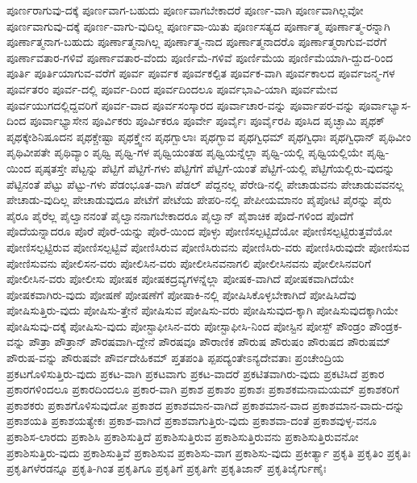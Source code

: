 {ಪೂರ್ಣರಾಗುವು-ದಕ್ಕೆ
ಪೂರ್ಣವಾಗ-ಬಹುದು
ಪೂರ್ಣವಾಗಬೇಕಾದರೆ
ಪೂರ್ಣ-ವಾಗಿ
ಪೂರ್ಣವಾಗಿಲ್ಲವೋ
ಪೂರ್ಣವಾಗುವು-ದಕ್ಕೆ
ಪೂರ್ಣ-ವಾಗು-ವುದಿಲ್ಲ
ಪೂರ್ಣವಾ-ಯಿತು
ಪೂರ್ಣಸತ್ಯದ
ಪೂರ್ಣಾತ್ಮ
ಪೂರ್ಣಾತ್ಮ-ರನ್ನಾಗಿ
ಪೂರ್ಣಾತ್ಮನಾಗ-ಬಹುದು
ಪೂರ್ಣಾತ್ಮನಾಗಿಲ್ಲ
ಪೂರ್ಣಾತ್ಮ-ನಾದ
ಪೂರ್ಣಾತ್ಮನಾದರೊ
ಪೂರ್ಣಾತ್ಮರಾಗುವ-ವರೆಗೆ
ಪೂರ್ಣಾವತಾರ-ಗಳಿವೆ
ಪೂರ್ಣಾವತಾರ-ವೆಂದು
ಪೂರ್ಣಿಮೆ-ಗಳಿವೆ
ಪೂರ್ಣಿಮೆಯ
ಪೂರ್ಣಿಮೆಯಾಗಿ-ದ್ದುದ-ರಿಂದ
ಪೂರ್ತಿ
ಪೂರ್ತಿಯಾಗುವ-ವರೆಗೆ
ಪೂರ್ವ
ಪೂರ್ವಕ
ಪೂರ್ವಕಲ್ಪಿತ
ಪೂರ್ವಕ-ವಾಗಿ
ಪೂರ್ವಕಾಲದ
ಪೂರ್ವಜನ್ಮ-ಗಳ
ಪೂರ್ವತರಂ
ಪೂರ್ವ-ದಲ್ಲಿ
ಪೂರ್ವ-ದಿಂದ
ಪೂರ್ವದಿಂದಲೂ
ಪೂರ್ವಭಾವಿ-ಯಾಗಿ
ಪೂರ್ವಮೇವ
ಪೂರ್ವಯುಗದಲ್ಲಿದ್ದವರಿಗೆ
ಪೂರ್ವ-ವಾದ
ಪೂರ್ವಸಂಸ್ಕಾರದ
ಪೂರ್ವಾಚಾರ-ವನ್ನು
ಪೂರ್ವಾಪರ-ವನ್ನು
ಪೂರ್ವಾಭ್ಯಾಸ-ದಿಂದ
ಪೂರ್ವಾಭ್ಯಾಸೇನ
ಪೂರ್ವಿಕರು
ಪೂರ್ವಿಕರೂ
ಪೂರ್ವೇ
ಪೂರ್ವೈಃ
ಪೂರ್ವೈರಪಿ
ಪೂಸಿದ
ಪೃಚ್ಛಾಮಿ
ಪೃಥಕ್
ಪೃಥಕ್ಕೇಶಿನಿಷೂದನ
ಪೃಥಕ್ಚೇಷ್ಟಾ
ಪೃಥಕ್ತ್ವೇನ
ಪೃಥಗ್ಬಾಲಾಃ
ಪೃಥಗ್ಭಾವ
ಪೃಥಗ್ವಿಧಮ್
ಪೃಥಗ್ವಿಧಾಃ
ಪೃಥಗ್ವಿಧಾನ್
ಪೃಥಿವೀಂ
ಪೃಥಿವೀಪತೇ
ಪೃಥಿವ್ಯಾಂ
ಪೃಥ್ವಿ
ಪೃಥ್ವಿ-ಗಳ
ಪೃಥ್ವಿಯಂತಹ
ಪೃಥ್ವಿಯನ್ನೆಲ್ಲಾ
ಪೃಥ್ವಿ-ಯಲ್ಲಿ
ಪೃಥ್ವಿಯಲ್ಲಿಯೇ
ಪೃಥ್ವಿ-ಯಿಂದ
ಪೃಷ್ಠತಸ್ತೇ
ಪೆಟ್ಟನ್ನು
ಪೆಟ್ಟಿಗೆ
ಪೆಟ್ಟಿಗೆ-ಗಳು
ಪೆಟ್ಟಿಗೆಗೆ
ಪೆಟ್ಟಿಗೆ-ಯಂತೆ
ಪೆಟ್ಟಿಗೆ-ಯಲ್ಲಿ
ಪೆಟ್ಟಿಗೆಯಲ್ಲಿರು-ವುದನ್ನು
ಪೆಟ್ಟಿನಂತೆ
ಪೆಟ್ಟು
ಪೆಟ್ಟು-ಗಳು
ಪೆಡಂಭೂತ-ವಾಗಿ
ಪೆಡಲ್
ಪೆದ್ದನಲ್ಲ
ಪೆರೇಡಿ-ನಲ್ಲಿ
ಪೇಚಾಡುವನು
ಪೇಚಾಡುವವನಲ್ಲ
ಪೇಚಾಡು-ವುದಿಲ್ಲ
ಪೇಚಾಡುವುದೂ
ಪೇಟೆಗೆ
ಪೇಟೆಯ
ಪೇಪರಿ-ನಲ್ಲಿ
ಪೇಪೀಯಮಾನಂ
ಪೈಪೋಟಿ
ಪೈರನ್ನು
ಪೈರು
ಪೈರೂ
ಪೈರೆಲ್ಲ
ಪೈಲ್ವಾನನಂತೆ
ಪೈಲ್ವಾನನಾಗಬೇಕಾದರೂ
ಪೈಲ್ವಾನ್
ಪೈಶಾಚಿಕ
ಪೊದೆ-ಗಳಿಂದ
ಪೊದೆಗೆ
ಪೊದೆಯನ್ನಾದರೂ
ಪೊರೆ
ಪೊರೆ-ಯನ್ನು
ಪೊರೆ-ಯಿಂದ
ಪೊಳ್ಳು
ಪೋಣಿಸಲ್ಪಟ್ಟಿದೆಯೋ
ಪೋಣಿಸಲ್ಪಟ್ಟಿರುತ್ತವೆಯೋ
ಪೋಣಿಸಲ್ಪಟ್ಟಿರುವ
ಪೋಣಿಸಲ್ಪಟ್ಟಿವೆ
ಪೋಣಿಸಿರುವ
ಪೋಣಿಸಿರುವನು
ಪೋಣಿಸಿರು-ವರು
ಪೋಣಿಸಿರುವುದೇ
ಪೋಣಿಸುವ
ಪೋಣಿಸುವನು
ಪೋಲಿಸನ-ವರು
ಪೋಲಿಸಿನ-ವರು
ಪೋಲೀಸಿನವನಾಗಲಿ
ಪೋಲೀಸಿನವನು
ಪೋಲೀಸಿನವರಿಗೆ
ಪೋಲೀಸಿನ-ವರು
ಪೋಲೀಸು
ಪೋಷಕ
ಪೋಷಕದ್ರವ್ಯಗಳನ್ನೆಲ್ಲಾ
ಪೋಷಕ-ವಾಗಿದೆ
ಪೋಷಕವಾಗಿದೆಯೇ
ಪೋಷಕವಾಗಿರು-ವುದು
ಪೋಷಣೆ
ಪೋಷಣೆಗೆ
ಪೋಷಾಕಿ-ನಲ್ಲಿ
ಪೋಷಿಸಿಕೊಳ್ಳಬೇಕಾಗಿದೆ
ಪೋಷಿಸಿದೆವು
ಪೋಷಿಸುತ್ತಿರು-ವುದು
ಪೋಷಿಸು-ತ್ತೇನೆ
ಪೋಷಿಸುವ
ಪೋಷಿಸು-ವರು
ಪೋಷಿಸುವುದ-ಕ್ಕಾಗಿ
ಪೋಷಿಸುವುದಕ್ಕಾಗಿಯೇ
ಪೋಷಿಸುವು-ದಕ್ಕೆ
ಪೋಷಿಸು-ವುದು
ಪೋಸ್ಟಾಫೀಸಿನ-ವರು
ಪೋಸ್ಟಾಫೀಸಿ-ನಿಂದ
ಪೋಸ್ಟಿನ
ಪೋಸ್ಟ್
ಪೌಂಡ್ರಂ
ಪೌಂಡ್ರಕ-ವನ್ನು
ಪೌತ್ರಾ
ಪೌತ್ರಾನ್
ಪೌರಷವಾಗಿ-ದ್ದೇನೆ
ಪೌರಷವೂ
ಪೌರಾಣಿಕ
ಪೌರುಷ
ಪೌರುಷಂ
ಪೌರುಷದ
ಪೌರುಷಮ್
ಪೌರುಷ-ವನ್ನು
ಪೌರುಷವೇ
ಪೌರ್ವದೇಹಿಕಮ್
ಪ್ತತಪಂತಿ
ಪ್ಪಪದ್ಯಂತೇಽನ್ಯದೇವತಾಃ
ಪ್ರಂಚೇಂದ್ರಿಯ
ಪ್ರಕಟಗೊಳಿಸುತ್ತಿರು-ವುದು
ಪ್ರಕಟ-ವಾಗಿ
ಪ್ರಕಟವಾಗು
ಪ್ರಕಟ-ವಾದರೆ
ಪ್ರಕಟಿತವಾಗಿರು-ವುದು
ಪ್ರಕಟಿಸಿದೆ
ಪ್ರಕಾರ
ಪ್ರಕಾರಗಳಿಂದಲೂ
ಪ್ರಕಾರದಿಂದಲೂ
ಪ್ರಕಾರ-ವಾಗಿ
ಪ್ರಕಾಶ
ಪ್ರಕಾಶಂ
ಪ್ರಕಾಶಃ
ಪ್ರಕಾಶಕಮನಾಮಯಮ್
ಪ್ರಕಾಶಕರಿಗೆ
ಪ್ರಕಾಶಕರು
ಪ್ರಕಾಶಗೊಳಿಸುವುದೋ
ಪ್ರಕಾಶದ
ಪ್ರಕಾಶಮಾನ-ವಾಗಿದೆ
ಪ್ರಕಾಶಮಾನ-ವಾದ
ಪ್ರಕಾಶಮಾನ-ವಾದು-ದನ್ನು
ಪ್ರಕಾಶಯತಿ
ಪ್ರಕಾಶಯತ್ಯೇಕಃ
ಪ್ರಕಾಶ-ವಾಗಿದೆ
ಪ್ರಕಾಶವಾಗುತ್ತಿರು-ವುದು
ಪ್ರಕಾಶವಾ-ದಂತೆ
ಪ್ರಕಾಶವುಳ್ಳ-ವನೂ
ಪ್ರಕಾಶಿಸ-ಲಾರದು
ಪ್ರಕಾಶಿಸಿ
ಪ್ರಕಾಶಿಸುತ್ತಿದೆ
ಪ್ರಕಾಶಿಸುತ್ತಿರುವ
ಪ್ರಕಾಶಿಸುತ್ತಿರುವನು
ಪ್ರಕಾಶಿಸುತ್ತಿರುವನೋ
ಪ್ರಕಾಶಿಸುತ್ತಿರು-ವುದು
ಪ್ರಕಾಶಿಸುತ್ತಿವೆ
ಪ್ರಕಾಶಿಸುವ
ಪ್ರಕಾಶಿಸು-ವಾಗ
ಪ್ರಕಾಶಿಸು-ವುದು
ಪ್ರಕೀರ್ತ್ಯಾ
ಪ್ರಕೃತಿ
ಪ್ರಕೃತಿಂ
ಪ್ರಕೃತಿಃ
ಪ್ರಕೃತಿಗಳೆರಡನ್ನೂ
ಪ್ರಕೃತಿ-ಗಿಂತ
ಪ್ರಕೃತಿಗೂ
ಪ್ರಕೃತಿಗೆ
ಪ್ರಕೃತಿಗೇ
ಪ್ರಕೃತಿಜಾನ್
ಪ್ರಕೃತಿಜೈರ್ಗುಣೈಃ
}
